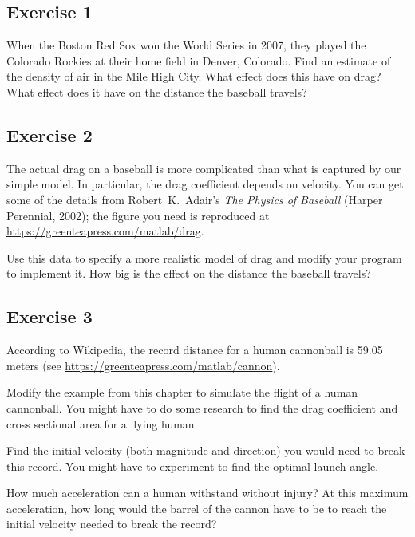 \subsection{Exercise 1}


When the Boston Red Sox won the World Series in 2007, they played the
Colorado Rockies at their home field in Denver, Colorado.  Find an
estimate of the density of air in the Mile High City.  What effect
does this have on drag?  What effect does it have on the distance the baseball travels?

\subsection{Exercise 2}


The actual drag on a baseball is more complicated than what is
captured by our simple model.  In particular, the drag coefficient
depends on velocity.  You can get some of the details from Robert~K.\ Adair's \emph{The
Physics of Baseball} (Harper Perennial, 2002); the figure you need is reproduced at \url{https://greenteapress.com/matlab/drag}.

Use this data to specify a more realistic model of drag and modify your
program to implement it.  How big is the effect on the distance the baseball travels?


\subsection{Exercise 3}
\label{cannon}


According to Wikipedia, the record distance for a human cannonball is 59.05 meters (see \url{https://greenteapress.com/matlab/cannon}).

Modify the example from this chapter to simulate the flight of a human cannonball.  You might have to do some research to find the drag coefficient and cross sectional area for a flying human.

Find the initial velocity (both magnitude and direction) you would need to break this record.  You might have to experiment to find the optimal launch angle.

How much acceleration can a human withstand without injury?  At this maximum acceleration, how long would the barrel of the cannon have to be to reach the initial velocity needed to break the record?



